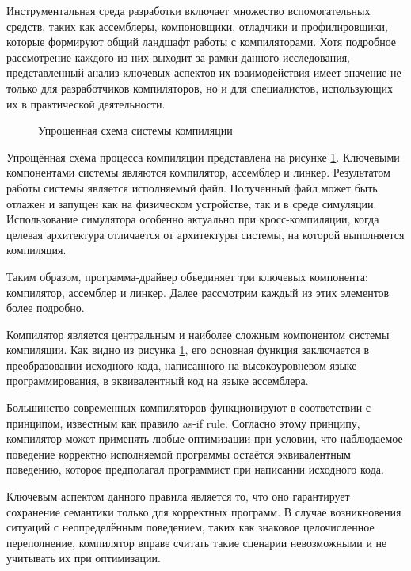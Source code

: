 Инструментальная среда разработки включает множество вспомогательных средств, таких как ассемблеры, компоновщики, отладчики и профилировщики, которые формируют общий ландшафт работы с компиляторами. Хотя подробное рассмотрение каждого из них выходит за рамки данного исследования, представленный анализ ключевых аспектов их взаимодействия имеет значение не только для разработчиков компиляторов, но и для специалистов, использующих их в практической деятельности.

\begin{figure}[H]
	\centering
	\caption{Упрощенная схема системы компиляции}
	\label{fig:tulchain}
\end{figure}

Упрощённая схема процесса компиляции представлена на рисунке \ref{fig:tulchain}. Ключевыми компонентами системы являются компилятор, ассемблер и линкер. Результатом работы системы является исполняемый файл. Полученный файл может быть отлажен и запущен как на физическом устройстве, так и в среде симуляции. Использование симулятора особенно актуально при кросс-компиляции, когда целевая архитектура отличается от архитектуры системы, на которой выполняется компиляция.

Таким образом, программа-драйвер объединяет три ключевых компонента: компилятор, ассемблер и линкер. Далее рассмотрим каждый из этих элементов более подробно.

Компилятор является центральным и наиболее сложным компонентом системы компиляции. Как видно из рисунка \ref{fig:tulchain}, его основная функция заключается в преобразовании исходного кода, написанного на высокоуровневом языке программирования, в эквивалентный код на языке ассемблера. 

Большинство современных компиляторов функционируют в соответствии с принципом, известным как правило as-if rule. Согласно этому принципу, компилятор может применять любые оптимизации при условии, что наблюдаемое поведение корректно исполняемой программы остаётся эквивалентным поведению, которое предполагал программист при написании исходного кода.

Ключевым аспектом данного правила является то, что оно гарантирует сохранение семантики только для корректных программ. В случае возникновения ситуаций с неопределённым поведением, таких как знаковое целочисленное переполнение, компилятор вправе считать такие сценарии невозможными и не учитывать их при оптимизации.

